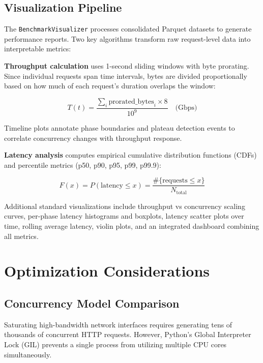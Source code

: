 \subsection{Visualization Pipeline}\label{sec:visualization}

The \texttt{BenchmarkVisualizer} processes consolidated Parquet datasets to generate performance reports. Two key algorithms transform raw request-level data into interpretable metrics:

\textbf{Throughput calculation} uses 1-second sliding windows with byte prorating. Since individual requests span time intervals, bytes are divided proportionally based on how much of each request's duration overlaps the window:

\begin{equation}
T(t) = \frac{\sum_{i} \text{prorated\_bytes}_i \times 8}{10^9} \quad \text{(Gbps)}
\end{equation}

Timeline plots annotate phase boundaries and plateau detection events to correlate concurrency changes with throughput response.

\textbf{Latency analysis} computes empirical cumulative distribution functions (CDFs) and percentile metrics (p50, p90, p95, p99, p99.9):

\begin{equation}
F(x) = P(\text{latency} \leq x) = \frac{\#\{\text{requests} \leq x\}}{N_{\text{total}}}
\end{equation}

Additional standard visualizations include throughput vs concurrency scaling curves, per-phase latency histograms and boxplots, latency scatter plots over time, rolling average latency, violin plots, and an integrated dashboard combining all metrics.

\section{Optimization Considerations}\label{sec:optimization}

\subsection{Concurrency Model Comparison}\label{sec:solution-comparison}

Saturating high-bandwidth network interfaces requires generating tens of thousands of concurrent HTTP requests. However, Python's Global Interpreter Lock (GIL) prevents a single process from utilizing multiple CPU cores simultaneously.

